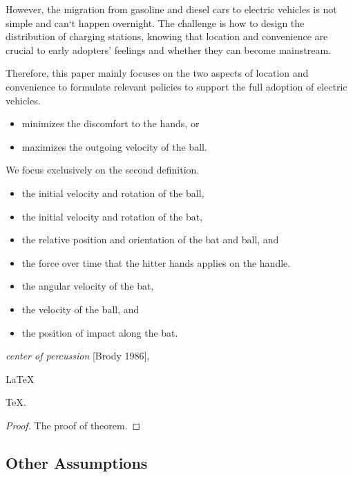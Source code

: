 \documentclass{mcmthesis}
\begin{document}
   However, the migration from gasoline and diesel cars to electric vehicles is not simple and can`t happen overnight. The challenge is how to design the distribution of charging stations, knowing that location and convenience are crucial to early adopters' feelings and whether they can become mainstream.
   
   Therefore, this paper mainly focuses on the two aspects of location and convenience to formulate relevant policies to support the full adoption of electric vehicles.


\begin{itemize}
\item minimizes the discomfort to the hands, or
\item maximizes the outgoing velocity of the ball.
\end{itemize}
We focus exclusively on the second definition.

\begin{itemize}
\item the initial velocity and rotation of the ball,
\item the initial velocity and rotation of the bat,
\item the relative position and orientation of the bat and ball, and
\item the force over time that the hitter hands applies on the handle.
\end{itemize}

\begin{itemize}
\item the angular velocity of the bat,
\item the velocity of the ball, and
\item the position of impact along the bat.
\end{itemize}

\emph{center of percussion} [Brody 1986], 

\begin{Theorem} \label{thm:latex} %
\LaTeX
\end{Theorem}
\begin{Lemma} \label{thm:tex}  %
\TeX .
\end{Lemma}
\begin{proof}
The proof of theorem.
\end{proof}

\subsection{Other Assumptions}  %
\end{document}
